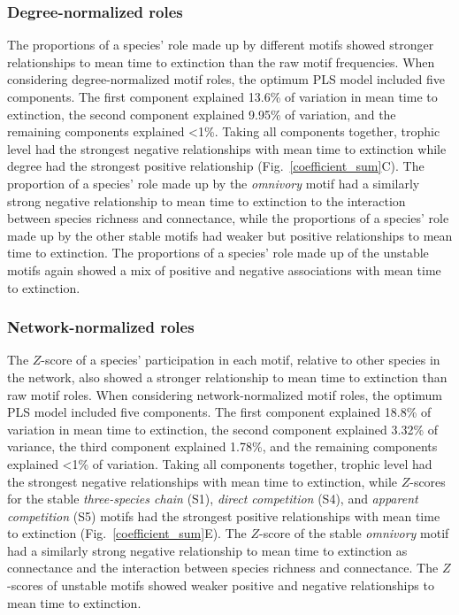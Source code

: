 \documentclass[12pt]{article}
\begin{document}
        \subsubsection*{Degree-normalized roles}
        
    		The proportions of a species' role made up by different motifs showed stronger relationships to mean time to extinction than the raw motif frequencies.
    		When considering degree-normalized motif roles, the optimum PLS model included five components.
    		The first component explained 13.6\% of variation in mean time to extinction, the second component explained 9.95\% of variation, and the remaining components explained \textless1\%.
            Taking all components together, trophic level had the strongest negative relationships with mean time to extinction while degree had the strongest positive relationship (Fig.~\ref{coefficient_sum}C).
            The proportion of a species' role made up by the \emph{omnivory} motif had a similarly strong negative relationship to mean time to extinction to the interaction between species richness and connectance, while the proportions of a species' role made up by the other stable motifs had weaker but positive relationships to mean time to extinction.
            The proportions of a species' role made up of the unstable motifs again showed a mix of positive and negative associations with mean time to extinction.

        \subsubsection*{Network-normalized roles}
        
    		The $Z$-score of a species' participation in each motif, relative to other species in the network, also showed a stronger relationship to mean time to extinction than raw motif roles.
    		When considering network-normalized motif roles, the optimum PLS model included five components.
    		The first component explained 18.8\% of variation in mean time to extinction, the second component explained 3.32\% of variance, the third component explained 1.78\%, and the remaining components explained \textless1\% of variation.
    		Taking all components together, trophic level had the strongest negative relationships  with mean time to extinction, while $Z$-scores for the stable \emph{three-species chain} (S1), \emph{direct competition} (S4), and \emph{apparent competition} (S5) motifs had the strongest positive relationships with mean time to extinction (Fig.~\ref{coefficient_sum}E). 
    		The $Z$-score of the stable \emph{omnivory} motif had a similarly strong negative relationship to mean time to extinction as connectance and the interaction between species richness and connectance.
    		The $Z$-scores of unstable motifs showed weaker positive and negative relationships to mean time to extinction.
    		
\end{document}
